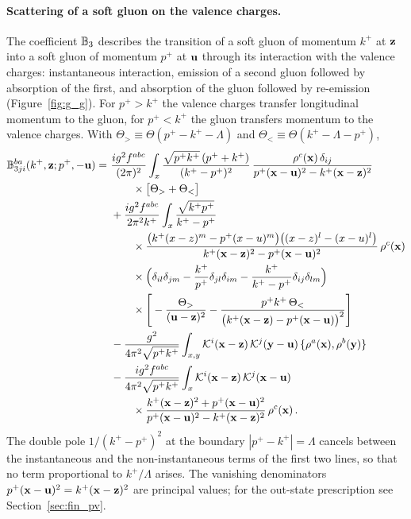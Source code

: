 \paragraph{Scattering of a soft gluon on the valence charges.} The coefficient $\mathbb{B}_3$ describes the transition of a soft gluon of momentum $k^+$ at $\mathbf{z}$ into a soft gluon of momentum $p^+$ at $\mathbf{u}$ through its interaction with the valence charges: instantaneous interaction, emission of a second gluon followed by absorption of the first, and absorption of the gluon followed by re-emission (Figure~\ref{fig:g_g}). For $p^+>k^+$ the valence charges transfer longitudinal momentum to the gluon, for $p^+<k^+$ the gluon transfers momentum to the valence charges. With $\Theta_>\equiv\Theta(p^+-k^+-\Lambda)$ and $\Theta_<\equiv\Theta(k^+-\Lambda-p^+)$,
\begin{align}\label{eq:B3}
\mf B^{ba}_{3ji}(k^+,\v z;p^+,-\v u)=\ &\frac{ig^2f^{abc}}{(2\pi)^2}\int_x\frac{\sqrt{p^+k^+}\,(p^++k^+)}{(k^+-p^+)^2}\,\frac{\rho^c(\v x)\,\delta_{ij}}{p^+(\v x-\v u)^2-k^+(\v x-\v z)^2}
\notag\\&\qquad\times\big[\Theta_>+\Theta_<\big]
\notag\\&
+\frac{ig^2f^{abc}}{2\pi^2k^+}\int_x\frac{\sqrt{k^+p^+}}{k^+-p^+}
\notag\\&\qquad\times\frac{\big(k^+(x-z)^m-p^+(x-u)^m\big)\big((x-z)^l-(x-u)^l\big)}{k^+(\v x-\v z)^2-p^+(\v x-\v u)^2}\,\rho^c(\v x)
\notag\\&\qquad\times\Big(\delta_{il}\delta_{jm}-\frac{k^+}{p^+}\delta_{jl}\delta_{im}-\frac{k^+}{k^+-p^+}\delta_{ij}\delta_{lm}\Big)
\notag\\&\qquad\times\Bigg[-\frac{\Theta_>}{(\v u-\v z)^2}-\frac{p^+k^+\,\Theta_<}{\big(k^+(\v x-\v z)-p^+(\v x-\v u)\big)^2}\Bigg]
\notag\\&
-\frac{g^2}{4\pi^2\sqrt{p^+k^+}}\int_{x,y}\Kv^i(\v x-\v z)\,\Kv^j(\v y-\v u)\,\{\rho^a(\v x),\rho^b(\v y)\}
\notag\\&
-\frac{ig^2f^{abc}}{4\pi^2\sqrt{p^+k^+}}\int_x\Kv^i(\v x-\v z)\,\Kv^j(\v x-\v u)
\notag\\&\qquad\times\frac{k^+(\v x-\v z)^2+p^+(\v x-\v u)^2}{p^+(\v x-\v u)^2-k^+(\v x-\v z)^2}\,\rho^c(\v x)\,.
\end{align}
The double pole $1/(k^+-p^+)^2$ at the boundary $|p^+-k^+|=\Lambda$ cancels between the instantaneous and the non-instantaneous terms of the first two lines, so that no term proportional to $k^+/\Lambda$ arises. The vanishing denominators $p^+(\mathbf{x}-\mathbf{u})^2=k^+(\mathbf{x}-\mathbf{z})^2$ are principal values; for the out-state prescription see Section~\ref{sec:fin_pv}.

